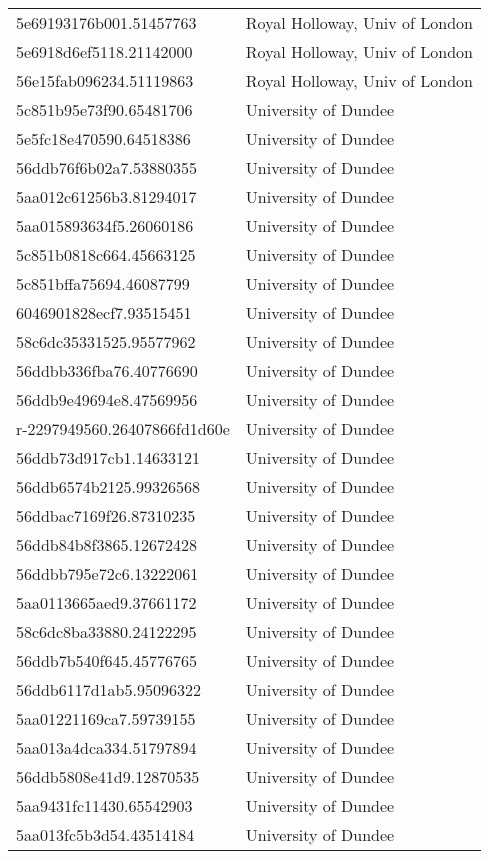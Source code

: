 \begin{tabular}{ll}
5e69193176b001.51457763 & Royal Holloway, Univ of London \\
5e6918d6ef5118.21142000 & Royal Holloway, Univ of London \\
56e15fab096234.51119863 & Royal Holloway, Univ of London \\
5c851b95e73f90.65481706 & University of Dundee \\
5e5fc18e470590.64518386 & University of Dundee \\
56ddb76f6b02a7.53880355 & University of Dundee \\
5aa012c61256b3.81294017 & University of Dundee \\
5aa015893634f5.26060186 & University of Dundee \\
5c851b0818c664.45663125 & University of Dundee \\
5c851bffa75694.46087799 & University of Dundee \\
6046901828ecf7.93515451 & University of Dundee \\
58c6dc35331525.95577962 & University of Dundee \\
56ddbb336fba76.40776690 & University of Dundee \\
56ddb9e49694e8.47569956 & University of Dundee \\
r-2297949560.26407866fd1d60e & University of Dundee \\
56ddb73d917cb1.14633121 & University of Dundee \\
56ddb6574b2125.99326568 & University of Dundee \\
56ddbac7169f26.87310235 & University of Dundee \\
56ddb84b8f3865.12672428 & University of Dundee \\
56ddbb795e72c6.13222061 & University of Dundee \\
5aa0113665aed9.37661172 & University of Dundee \\
58c6dc8ba33880.24122295 & University of Dundee \\
56ddb7b540f645.45776765 & University of Dundee \\
56ddb6117d1ab5.95096322 & University of Dundee \\
5aa01221169ca7.59739155 & University of Dundee \\
5aa013a4dca334.51797894 & University of Dundee \\
56ddb5808e41d9.12870535 & University of Dundee \\
5aa9431fc11430.65542903 & University of Dundee \\
5aa013fc5b3d54.43514184 & University of Dundee \\

\end{tabular}
